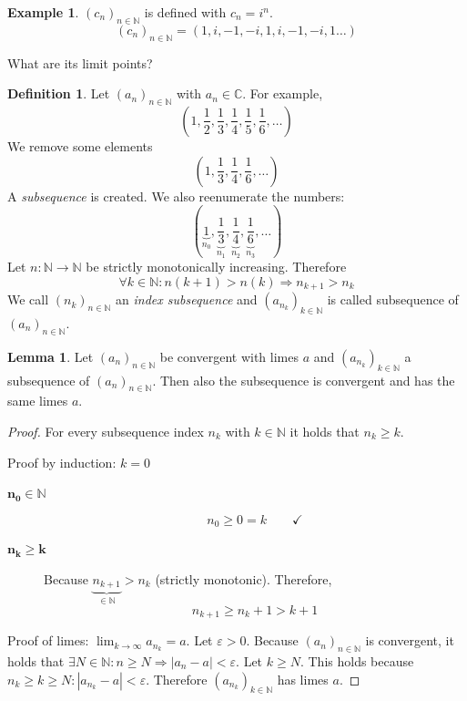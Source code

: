 \documentclass[a4paper,landscape,twocolumn]{article}
\theoremstyle{definition}
\newtheorem{defi}{Definition}
\newtheorem{ex}{Example}
\newtheorem{lemma}{Lemma}
\newcommand\abs[1]{\left|#1\right|}
\newcommand\seq[1]{{\left(#1\right)}_{n \in \mathbb N}}
\begin{document}
\begin{ex}
  $\seq{c_n}$ is defined with $c_n = i^n$.
  \[ \seq{c_n} = (1, i, -1, -i, 1, i, -1, -i, 1 \dots) \]

  What are its limit points?
\end{ex}

\begin{defi}
  Let $\seq{a_n}$ with $a_n \in \mathbb C$. For example,
  \[ (1, \frac12, \frac13, \frac14, \frac15, \frac16, \dots) \]
  We remove some elements
  \[ (1, \frac13, \frac14, \frac16, \dots) \]
  A \emph{subsequence} is created.
  We also reenumerate the numbers:
  \[ (\underbrace{1}_{n_0}, \underbrace{\frac13}_{n_1}, \underbrace{\frac14}_{n_2}, \underbrace{\frac16}_{n_3}, \dots) \]
  Let $n: \mathbb N \to \mathbb N$ be strictly monotonically increasing.
  Therefore
  \[ \forall k \in \mathbb N: n (k+1) > n(k) \Rightarrow n_{k+1} > n_k \]
  We call $\seq{n_k}$ an \emph{index subsequence} and $\left(a_{n_k}\right)_{k \in \mathbb N}$ is called subsequence of $\seq{a_n}$.
\end{defi}

\begin{lemma}
  Let $\seq{a_n}$ be convergent with limes $a$ and $\left(a_{n_k}\right)_{k \in \mathbb N}$ a subsequence of $\seq{a_n}$.
  Then also the subsequence is convergent and has the same limes $a$.
\end{lemma}
\begin{proof}
  For every subsequence index $n_k$ with $k \in \mathbb N$ it holds that $n_k \geq k$.

  Proof by induction: $k=0$
  \begin{description}
    \item[$\mathbf{n_0 \in \mathbb N}$] \[ n_0 \geq 0 = k \qquad\checkmark \]
    \item[$\mathbf{n_k \geq k}$]
      Because $\underbrace{n_{k+1}}_{\in \mathbb N} > n_k$ (strictly monotonic).
      Therefore,
      \[ n_{k+1} \geq n_k + 1 > k + 1 \]
  \end{description}

  Proof of limes: $\lim_{k\to\infty} a_{n_k} = a$.
  Let $\varepsilon > 0$. Because $\seq{a_n}$ is convergent, it holds that
  $\exists N \in \mathbb N: n \geq N \Rightarrow \abs{a_n - a} < \varepsilon$.
  Let $k \geq N$. This holds because $n_k \geq k \geq N: \abs{a_{n_k} - a} < \varepsilon$.
  Therefore $\left(a_{n_k}\right)_{k \in \mathbb N}$ has limes $a$.
\end{proof}
\end{document}
